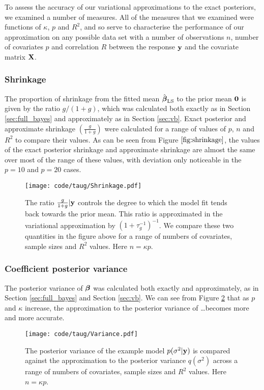 \documentclass{amsart}[12pt]
\begin{document}
To assess the accuracy of our variational approximations to the exact posteriors, we examined a number of
measures. All of the measures that we examined were functions of $\kappa$, $p$ and $R^2$, and so serve to
characterise the performance of our approximation on any possible data set with a number of observations
$n$, number of covariates $p$ and correlation $R$ between the response ${\bf y}$ and the covariate matrix ${\bf X}$.

\subsubsection{Shrinkage}

The proportion of shrinkage from the fitted mean $\hat{{\boldsymbol \beta}}_{\text{LS}}$ to the prior mean ${\bf 0}$ is given by the
ratio $g/(1 + g)$, which was calculated both exactly as in Section \ref{sec:full_bayes} and approximately as
in Section \ref{sec:vb}. Exact posterior and approximate shrinkage $\left( \frac{g}{1 + g} \right)$ were
calculated for a range of values of $p$, $n$ and $R^2$ to compare their values. As can be seen from Figure
$\ref{fig:shrinkage}$, the values of the exact posterior shrinkage and approximate shrinkage are almost the
same over most of the range of these values, with deviation only noticeable in the $p=10$ and $p=20$ cases.

\begin{figure}[p]
	\texttt{[image: code/taug/Shrinkage.pdf]}
	\caption{The ratio $\frac{g}{1 + g} | {\bf y}$ controls the degree to which the model fit tends back towards
		the prior mean. This ratio is approximated in the variational approximation by $(1 + \tau_g^{-1})^{-1}$. We
		compare these two quantities in the figure above for a range of numbers of covariates, sample sizes and $R^2$
		values. Here $n = \kappa p$.}
	\label{fig:shrinkage}
\end{figure}

\subsubsection{Coefficient posterior variance}

The posterior variance of ${\boldsymbol \beta}$ was calculated both exactly and approximately, as in Section
\ref{sec:full_bayes} and Section \ref{sec:vb}. We can see from Figure \ref{fig:variance} that as $p$ and
$\kappa$ increase, the approximation to the posterior variance of \ldots becomes more and more accurate.

\begin{figure}[p]
	\texttt{[image: code/taug/Variance.pdf]}
	\caption{The posterior variance of the example model $p(\sigma^2 | {\bf y})$ is compared against the approximation
		to the posterior variance $q(\sigma^2)$ across a range of numbers of covariates, sample sizes and $R^2$
		values. Here $n = \kappa p$.}
	\label{fig:variance}
\end{figure}
\end{document}
